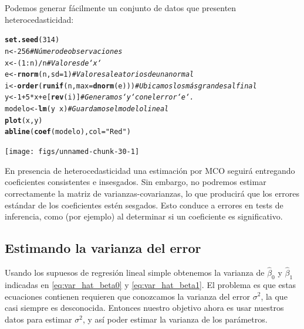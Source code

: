 \documentclass{report}\usepackage[]{graphicx}\usepackage[]{color}
\makeatletter
\newcommand{\hlnum}[1]{\textcolor[rgb]{0.686,0.059,0.569}{#1}}%
\newcommand{\hlstr}[1]{\textcolor[rgb]{0.192,0.494,0.8}{#1}}%
\newcommand{\hlcom}[1]{\textcolor[rgb]{0.678,0.584,0.686}{\textit{#1}}}%
\newcommand{\hlopt}[1]{\textcolor[rgb]{0,0,0}{#1}}%
\newcommand{\hlstd}[1]{\textcolor[rgb]{0.345,0.345,0.345}{#1}}%
\newcommand{\hlkwb}[1]{\textcolor[rgb]{0.69,0.353,0.396}{#1}}%
\newcommand{\hlkwc}[1]{\textcolor[rgb]{0.333,0.667,0.333}{#1}}%
\newcommand{\hlkwd}[1]{\textcolor[rgb]{0.737,0.353,0.396}{\textbf{#1}}}%
\newenvironment{kframe}{%
 \def\at@end@of@kframe{}%
 \ifinner\ifhmode%
  \def\at@end@of@kframe{\end{minipage}}%
  \begin{minipage}{\columnwidth}%
 \fi\fi%
 \def\FrameCommand##1{\hskip\@totalleftmargin \hskip-\fboxsep
 \colorbox{shadecolor}{##1}\hskip-\fboxsep
     \hskip-\linewidth \hskip-\@totalleftmargin \hskip\columnwidth}%
 \MakeFramed {\advance\hsize-\width
   \@totalleftmargin\z@ \linewidth\hsize
   \@setminipage}}%
 {\par\unskip\endMakeFramed%
 \at@end@of@kframe}
\newenvironment{knitrout}{}{} %
\makeatother
\begin{document}
Podemos generar fácilmente un conjunto de datos que presenten heterocedasticidad:

\begin{knitrout}
\color{fgcolor}\begin{kframe}
\begin{alltt}
\hlkwd{set.seed}\hlstd{(}\hlnum{314}\hlstd{)}
\hlstd{n} \hlkwb{<-} \hlnum{256}                           \hlcom{# Número de observaciones}
\hlstd{x} \hlkwb{<-} \hlstd{(}\hlnum{1}\hlopt{:}\hlstd{n)}\hlopt{/}\hlstd{n}                       \hlcom{# Valores de `x`}
\hlstd{e} \hlkwb{<-} \hlkwd{rnorm}\hlstd{(n,} \hlkwc{sd}\hlstd{=}\hlnum{1}\hlstd{)}                \hlcom{# Valores aleatorios de una normal}
\hlstd{i} \hlkwb{<-} \hlkwd{order}\hlstd{(}\hlkwd{runif}\hlstd{(n,} \hlkwc{max}\hlstd{=}\hlkwd{dnorm}\hlstd{(e)))} \hlcom{# Ubicamos los más grandes al final}
\hlstd{y} \hlkwb{<-} \hlnum{1} \hlopt{+} \hlnum{5} \hlopt{*} \hlstd{x} \hlopt{+} \hlstd{e[}\hlkwd{rev}\hlstd{(i)]}         \hlcom{# Generamos `y` con el error `e`.}
\hlstd{modelo} \hlkwb{<-} \hlkwd{lm}\hlstd{(y} \hlopt{~} \hlstd{x)}                \hlcom{# Guardamos el modelo lineal}
\hlkwd{plot}\hlstd{(x, y)}
\hlkwd{abline}\hlstd{(}\hlkwd{coef}\hlstd{(modelo),} \hlkwc{col} \hlstd{=} \hlstr{"Red"}\hlstd{)}
\end{alltt}
\end{kframe}

{\centering \texttt{[image: figs/unnamed-chunk-30-1]} 

}



\end{knitrout}

En presencia de heterocedasticidad una estimación por MCO seguirá entregando coeficientes consistentes e insesgados. Sin embargo, no podremos estimar correctamente la matriz de varianzas-covarianzas, lo que producirá que los errores estándar de los coeficientes estén sesgados. Esto conduce a errores en tests de inferencia, como (por ejemplo) al determinar si un coeficiente es significativo.

\subsection{Estimando la varianza del error}

Usando los supuesos de regresión lineal simple obtenemos la varianza de $\hat\beta_0$ y $\hat\beta_1$ indicadas en \eqref{eq:var_hat_beta0} y \eqref{eq:var_hat_beta1}.
El problema es que estas ecuaciones contienen requieren que conozcamos la varianza del error $\sigma^2$, la que casi siempre es desconocida.
Entonces nuestro objetivo ahora es usar nuestros datos para estimar $\sigma^2$, y así poder estimar la varianza de los parámetros.
\end{document}

